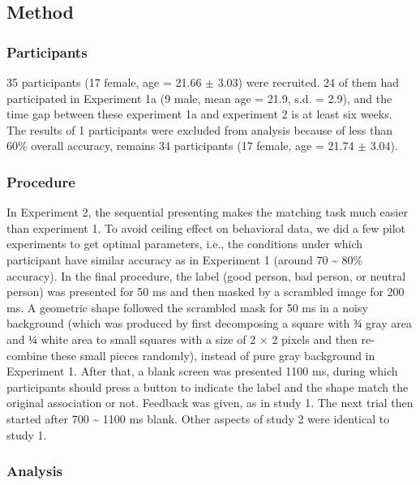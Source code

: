 \documentclass[
  english,
  man]{apa6}
\begin{document}
\hypertarget{method-2}{%
\subsection{Method}\label{method-2}}

\hypertarget{participants-3}{%
\subsubsection{Participants}\label{participants-3}}

35 participants (17 female, age = 21.66 \(\pm\) 3.03) were recruited. 24 of them had participated in Experiment 1a (9 male, mean age = 21.9, s.d. = 2.9), and the time gap between these experiment 1a and experiment 2 is at least six weeks. The results of 1 participants were excluded from analysis because of less than 60\% overall accuracy, remains 34 participants (17 female, age = 21.74 \(\pm\) 3.04).

\hypertarget{procedure-3}{%
\subsubsection{Procedure}\label{procedure-3}}

In Experiment 2, the sequential presenting makes the matching task much easier than experiment 1. To avoid ceiling effect on behavioral data, we did a few pilot experiments to get optimal parameters, i.e., the conditions under which participant have similar accuracy as in Experiment 1 (around 70 \textasciitilde{} 80\% accuracy).
In the final procedure, the label (good person, bad person, or neutral person) was presented for 50 ms and then masked by a scrambled image for 200 ms. A geometric shape followed the scrambled mask for 50 ms in a noisy background (which was produced by first decomposing a square with \(¾\) gray area and \(¼\) white area to small squares with a size of 2 × 2 pixels and then re-combine these small pieces randomly), instead of pure gray background in Experiment 1. After that, a blank screen was presented 1100 ms, during which participants should press a button to indicate the label and the shape match the original association or not. Feedback was given, as in study 1. The next trial then started after 700 \textasciitilde{} 1100 ms blank. Other aspects of study 2 were identical to study 1.

\hypertarget{analysis}{%
\subsubsection{Analysis}\label{analysis}}
\end{document}
